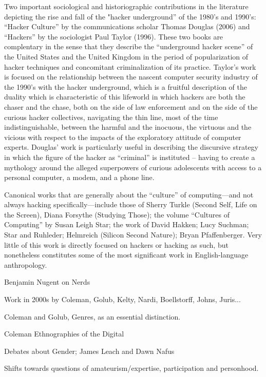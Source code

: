 \documentclass[10pt,letter,oneside]{scrartcl}
\begin{document}
Two important sociological and historiographic contributions in the literature depicting the rise and fall of the "hacker underground'' of the 1980's and 1990's: ``Hacker Culture'' by the communications scholar Thomas Douglas (2006) and ``Hackers'' by the sociologist Paul Taylor (1996). These two books are complentary in the sense that they describe the ``underground hacker scene'' of the United States and the United Kingdom in the period of popularization of hacker techniques and concomitant criminalization of its practice. Taylor's work is focused on the relationship between the nascent computer security industry of the 1990's with the hacker underground, which is a fruitful description of the duality which is characteristic of this lifeworld in which hackers are both the chaser and the chase, both on the side of law enforcement and on the side of the curious hacker collectives, navigating the thin line, most of the time indistinguishable, between the harmful and the inocuous, the virtuous and the vicious with respect to the impacts of the exploratory attitude of computer experts. Douglas' work is particularly useful in describing the discursive strategy in which the figure of the hacker as ``criminal'' is instituted -- having to create a mythology around the alleged superpowers of curious adolescents with access to a personal computer, a modem, and a phone line.


Canonical works that are generally about the ``culture'' of computing---and not always hacking specifically---include those of Sherry Turkle (Second Self, Life on the Screen), Diana Forsythe (Studying Those); the volume ``Cultures of Computing'' by Susan Leigh Star; the work of David Hakken; Lucy Suchman; Star and Ruhleder; Helmreich (Silicon Second Nature); Bryan Pfaffenberger.  Very little of this work is directly focused on hackers or hacking as such, but nonetheless constitutes some of the most significant work in English-language anthropology.

Benjamin Nugent on Nerds

Work in 2000s by Coleman, Golub, Kelty, Nardi, Boellstorff, Johns, Juris... 

Coleman and Golub, Genres, as an essential distinction. 

Coleman Ethnographies of the Digital

Debates about Gender;  James Leach and Dawn Nafus

Shifts towards questions of amateurism/expertise, participation and personhood. 
\end{document}
